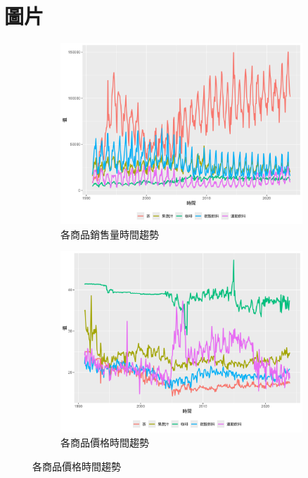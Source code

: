 \section*{圖片}

\begin{figure}[H]  %
\begin{center}
\caption{各變數時間趨勢} \label{trend}
	\begin{subfigure}[b]{0.65\textwidth}
	 	\caption{各商品銷售量時間趨勢} \label{trend_volume}
		\vspace{-0.85em}
	 	\includegraphics[width=\textwidth]{../outcome/chart1.png}  %
	 \end{subfigure}
	 \begin{subfigure}[b]{0.65\textwidth}
		\caption{各商品價格時間趨勢} \label{trend_price}
		\vspace{-0.85em}
		\includegraphics[width=\textwidth]{../outcome/chart2.png}
	\end{subfigure}
\end{center}
\end{figure}

